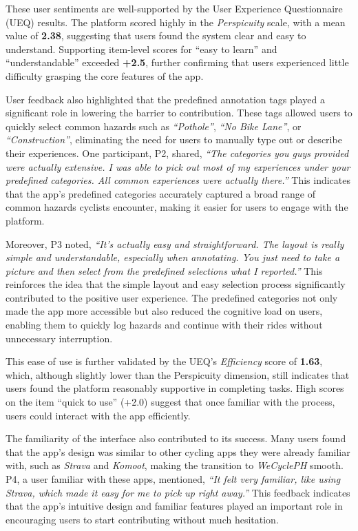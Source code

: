 These user sentiments are well-supported by the User Experience Questionnaire (UEQ) results. The platform scored highly in the \textit{Perspicuity} scale, with a mean value of \textbf{2.38}, suggesting that users found the system clear and easy to understand. Supporting item-level scores for “easy to learn” and “understandable” exceeded \textbf{+2.5}, further confirming that users experienced little difficulty grasping the core features of the app.

User feedback also highlighted that the predefined annotation tags played a significant role in lowering the barrier to contribution. These tags allowed users to quickly select common hazards such as \textit{``Pothole''}, \textit{``No Bike Lane''}, or \textit{``Construction''}, eliminating the need for users to manually type out or describe their experiences. One participant, P2, shared, \textit{``The categories you guys provided were actually extensive. I was able to pick out most of my experiences under your predefined categories. All common experiences were actually there.''} This indicates that the app's predefined categories accurately captured a broad range of common hazards cyclists encounter, making it easier for users to engage with the platform.

Moreover, P3 noted, \textit{``It's actually easy and straightforward. The layout is really simple and understandable, especially when annotating. You just need to take a picture and then select from the predefined selections what I reported.''} This reinforces the idea that the simple layout and easy selection process significantly contributed to the positive user experience. The predefined categories not only made the app more accessible but also reduced the cognitive load on users, enabling them to quickly log hazards and continue with their rides without unnecessary interruption.

This ease of use is further validated by the UEQ's \textit{Efficiency} score of \textbf{1.63}, which, although slightly lower than the Perspicuity dimension, still indicates that users found the platform reasonably supportive in completing tasks. High scores on the item “quick to use” (+2.0) suggest that once familiar with the process, users could interact with the app efficiently.

The familiarity of the interface also contributed to its success. Many users found that the app's design was similar to other cycling apps they were already familiar with, such as \textit{Strava} and \textit{Komoot}, making the transition to \textit{WeCyclePH} smooth. P4, a user familiar with these apps, mentioned, \textit{``It felt very familiar, like using Strava, which made it easy for me to pick up right away.''} This feedback indicates that the app's intuitive design and familiar features played an important role in encouraging users to start contributing without much hesitation.

